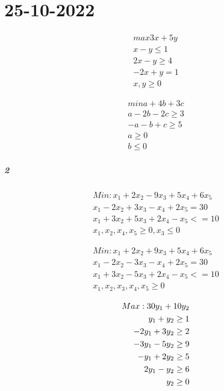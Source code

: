 \chapter{25-10-2022}

\begin{align}
    \text{$max 3x + 5y$} \\
    \text{$x - y \leq 1$} \\
    \text{$2x - y \geq 4$} \\
    \text{$-2x + y = 1$} \\
    \text{$x,y \geq 0$}
\end{align}

\begin{align}
\text{$min a + 4b + 3c$} \\
\text{$a - 2b - 2c \geq 3$} \\
\text{$-a - b + c \geq 5$} \\
\text{$a \geq 0$} \\
\text{$b \leq 0$} 
\end{align}

\paragraph{2}

\begin{align}
    \text{$Min : x_1 + 2 x_2 - 9 x_3 + 5 x_4 + 6 x_5$} \\
    \text{$x_1 - 2 x_2 + 3 x_3 - x_4 + 2 x_5 = 30$} \\
    \text{$x_1 + 3 x_2 + 5 x_3 + 2 x_4 - x_5 <= 10$} \\
    \text{$x_1, x_2,x_4,x_5 \geq 0, x_3 \leq 0$}
\end{align}

\begin{align}
    \text{$Min : x_1 + 2 x_2 + 9 x_3 + 5 x_4 + 6 x_5$} \\
    \text{$x_1 - 2 x_2 - 3 x_3 - x_4 + 2 x_5 = 30$} \\
    \text{$x_1 + 3 x_2 - 5 x_3 + 2 x_4 - x_5 <= 10$} \\
    \text{$x_1, x_2,x_3,x_4,x_5 \geq 0$}
\end{align}

\begin{align}
    \text{$Max : 30 y_1 + 10 y_2$} \\
    \text{$   y_1 +   y_2 \geq 1$} \\
    \text{$-2 y_1 + 3 y_2 \geq 2$} \\
    \text{$-3 y_1 - 5 y_2 \geq 9$} \\
    \text{$- y_1 + 2 y_2 \geq 5$} \\
    \text{$ 2 y_1 - y_2 \geq 6$} \\
    \text{$y_2 \geq 0$} 
\end{align}

